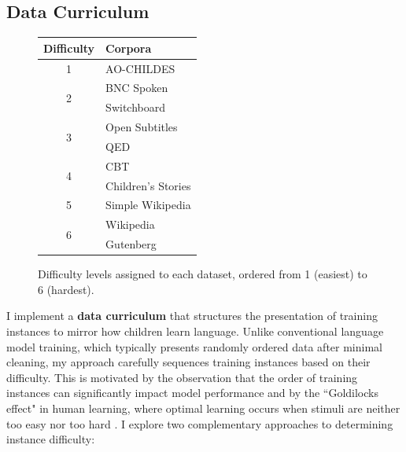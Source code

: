 \newpage
\subsection{Data Curriculum}
\label{subsec:data-cl}

\begin{figure}    
    \vspace{-1em}
    \centering
    \small
    \renewcommand{\arraystretch}{0.9}
    \begin{tabular}{cl}
    \toprule
    \textbf{Difficulty} & \textbf{Corpora} \\
    \midrule
    1 & AO-CHILDES \\
    \midrule
    \multirow{2}{*}{2} & BNC Spoken \\
                           & Switchboard \\
    \midrule
    \multirow{2}{*}{3} & Open Subtitles \\
                           & QED \\
    \midrule
    \multirow{2}{*}{4} & CBT \\
                           & Children's Stories \\
    \midrule
    5 & Simple Wikipedia \\
    \midrule
    \multirow{2}{*}{6} & Wikipedia \\
                           & Gutenberg \\
    \bottomrule
    \end{tabular}
    \caption{\label{tbl:source_order} Difficulty levels assigned to each dataset, ordered from 1 (easiest) to 6 (hardest).}
    \vspace{-2em}
\end{figure}

I implement a \textbf{data curriculum} that structures the presentation of training instances to mirror how children learn language. Unlike conventional language model training, which typically presents randomly ordered data after minimal cleaning, my approach carefully sequences training instances based on their difficulty. This is motivated by the observation that the order of training instances can significantly impact model performance \citep{schluter2018data} and by the ``Goldilocks effect" in human learning, where optimal learning occurs when stimuli are neither too easy nor too hard \citep{kidd2012goldilocks}. I explore two complementary approaches to determining instance difficulty:

